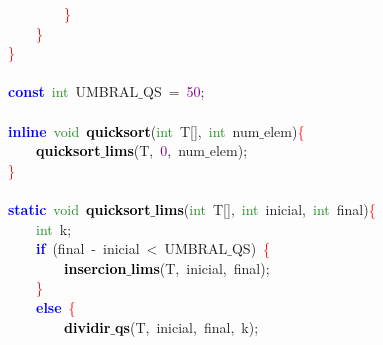 \mbox{}\ \ \ \ \ \ \ \ \textcolor{Red}{\}} \\
\mbox{}\ \ \ \ \textcolor{Red}{\}} \\
\mbox{}\textcolor{Red}{\}} \\
\mbox{} \\
\mbox{}\textbf{\textcolor{Blue}{const}}\ \textcolor{ForestGreen}{int}\ UMBRAL$\_$QS\ \textcolor{BrickRed}{=}\ \textcolor{Purple}{50}\textcolor{BrickRed}{;} \\
\mbox{} \\
\mbox{}\textbf{\textcolor{Blue}{inline}}\ \textcolor{ForestGreen}{void}\ \textbf{\textcolor{Black}{quicksort}}\textcolor{BrickRed}{(}\textcolor{ForestGreen}{int}\ T\textcolor{BrickRed}{[],}\ \textcolor{ForestGreen}{int}\ num$\_$elem\textcolor{BrickRed}{)}\textcolor{Red}{\{} \\
\mbox{}\ \ \ \ \textbf{\textcolor{Black}{quicksort$\_$lims}}\textcolor{BrickRed}{(}T\textcolor{BrickRed}{,}\ \textcolor{Purple}{0}\textcolor{BrickRed}{,}\ num$\_$elem\textcolor{BrickRed}{);} \\
\mbox{}\textcolor{Red}{\}} \\
\mbox{} \\
\mbox{}\textbf{\textcolor{Blue}{static}}\ \textcolor{ForestGreen}{void}\ \textbf{\textcolor{Black}{quicksort$\_$lims}}\textcolor{BrickRed}{(}\textcolor{ForestGreen}{int}\ T\textcolor{BrickRed}{[],}\ \textcolor{ForestGreen}{int}\ inicial\textcolor{BrickRed}{,}\ \textcolor{ForestGreen}{int}\ final\textcolor{BrickRed}{)}\textcolor{Red}{\{} \\
\mbox{}\ \ \ \ \textcolor{ForestGreen}{int}\ k\textcolor{BrickRed}{;} \\
\mbox{}\ \ \ \ \textbf{\textcolor{Blue}{if}}\ \textcolor{BrickRed}{(}final\ \textcolor{BrickRed}{-}\ inicial\ \textcolor{BrickRed}{\textless{}}\ UMBRAL$\_$QS\textcolor{BrickRed}{)}\ \textcolor{Red}{\{} \\
\mbox{}\ \ \ \ \ \ \ \ \textbf{\textcolor{Black}{insercion$\_$lims}}\textcolor{BrickRed}{(}T\textcolor{BrickRed}{,}\ inicial\textcolor{BrickRed}{,}\ final\textcolor{BrickRed}{);} \\
\mbox{}\ \ \ \ \textcolor{Red}{\}} \\
\mbox{}\ \ \ \ \textbf{\textcolor{Blue}{else}}\ \textcolor{Red}{\{} \\
\mbox{}\ \ \ \ \ \ \ \ \textbf{\textcolor{Black}{dividir$\_$qs}}\textcolor{BrickRed}{(}T\textcolor{BrickRed}{,}\ inicial\textcolor{BrickRed}{,}\ final\textcolor{BrickRed}{,}\ k\textcolor{BrickRed}{);} \\
